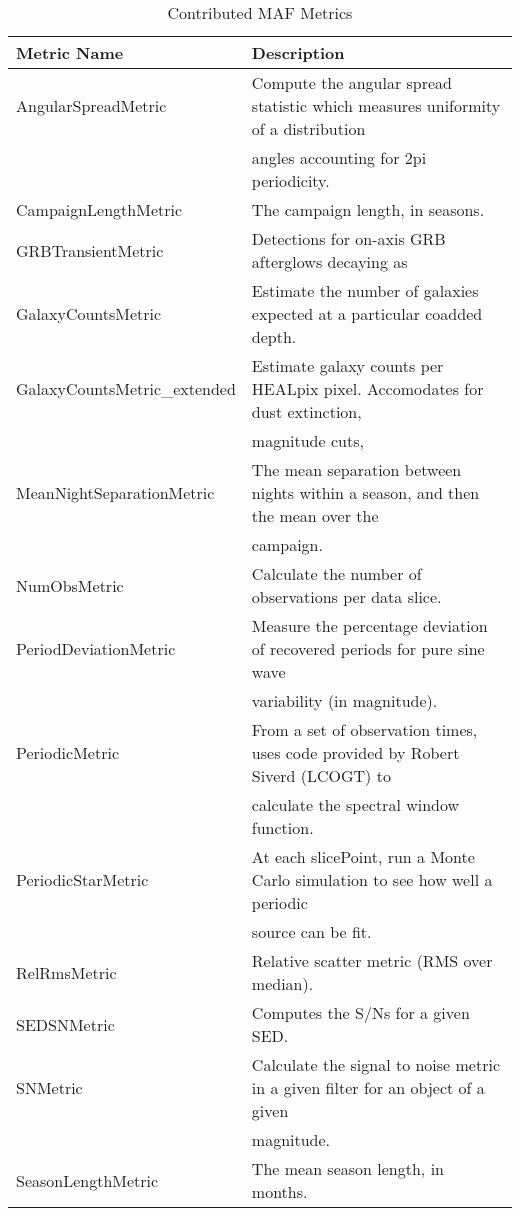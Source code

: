 \begin{table}
\scriptsize
\caption{Contributed MAF Metrics}
\begin{tabular}{ll}
\hline
                 Metric Name &                                                                       Description \\
\hline
 AngularSpreadMetric &  Compute the angular spread statistic which measures uniformity of a distribution \\
  &  angles accounting for 2pi periodicity. \\
 CampaignLengthMetric &  The campaign length, in seasons. \\
 GRBTransientMetric &  Detections for on-axis GRB afterglows decaying as \\
 GalaxyCountsMetric &  Estimate the number of galaxies expected at a particular coadded depth. \\
 GalaxyCountsMetric\_extended &  Estimate galaxy counts per HEALpix pixel. Accomodates for dust extinction, \\
  &  magnitude cuts, \\
 MeanNightSeparationMetric &  The mean separation between nights within a season, and then the mean over the \\
  &  campaign. \\
 NumObsMetric &  Calculate the number of observations per data slice. \\
 PeriodDeviationMetric &  Measure the percentage deviation of recovered periods for pure sine wave \\
  &  variability (in magnitude). \\
 PeriodicMetric &  From a set of observation times, uses code provided by Robert Siverd (LCOGT) to \\
  &  calculate the spectral window function. \\
 PeriodicStarMetric &  At each slicePoint, run a Monte Carlo simulation to see how well a periodic \\
  &  source can be fit. \\
 RelRmsMetric &  Relative scatter metric (RMS over median). \\
 SEDSNMetric &  Computes the S/Ns for a given SED. \\
 SNMetric &  Calculate the signal to noise metric in a given filter for an object of a given \\
  &  magnitude. \\
 SeasonLengthMetric &  The mean season length, in months. \\

\end{tabular}
\end{table}
